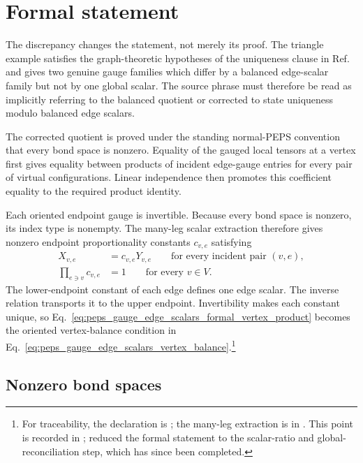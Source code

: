 \documentclass{article}
\begin{document}
\section{Formal statement}

The discrepancy changes the statement, not merely its proof. The triangle
example satisfies the graph-theoretic hypotheses of the uniqueness clause in
Ref.~\cite{Molnar2018NormalPEPS} and gives two genuine gauge families which
differ by a balanced edge-scalar family but not by one global scalar. The
source phrase must therefore be read as implicitly referring to the balanced
quotient or corrected to state uniqueness modulo balanced edge scalars.

The corrected quotient is proved under the standing normal-PEPS convention
that every bond space is nonzero. Equality of the gauged local tensors at a
vertex first gives equality between products of incident edge-gauge entries for
every pair of virtual configurations. Linear independence then promotes this
coefficient equality to the required product identity.

Each oriented endpoint gauge is invertible. Because every bond space is
nonzero, its index type is nonempty. The many-leg scalar extraction therefore
gives nonzero endpoint proportionality constants $c_{v,e}$ satisfying
\begin{align}
    X_{v,e}
        &= c_{v,e}Y_{v,e}
        \qquad\text{for every incident pair }(v,e),
    \label{eq:peps_gauge_edge_scalars_formal_endpoint_proportionality}\\
    \prod_{e\ni v}c_{v,e}
        &= 1
        \qquad\text{for every }v\in V.
    \label{eq:peps_gauge_edge_scalars_formal_vertex_product}
\end{align}
The lower-endpoint constant of each edge defines one edge scalar. The inverse
relation transports it to the upper endpoint. Invertibility makes each
constant unique, so
Eq.~\ref{eq:peps_gauge_edge_scalars_formal_vertex_product} becomes the
oriented vertex-balance condition in
Eq.~\ref{eq:peps_gauge_edge_scalars_vertex_balance}.\footnote{For traceability,
the declaration is
; the many-leg extraction is
 in
. This point is recorded in
;  reduced the formal statement to the scalar-ratio and
global-reconciliation step, which has since been completed.}

\subsection{Nonzero bond spaces}
\end{document}

